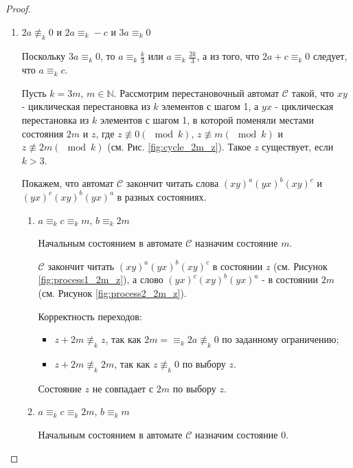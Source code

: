 \begin{proof}
\begin{enumerate}
			\item $2a \not \equiv_k 0$ и $2a \equiv_k -c$ и $3a \equiv_k 0$
			
			Поскольку $3a \equiv_k 0$, то $a \equiv_k \frac{k}{3}$ или $a \equiv_k \frac{2k}{3}$, а из того, что $2a+c \equiv_k 0$ следует, что $a \equiv_k c$.
			
			
			Пусть $k = 3m$, $m \in \mathbb{N}$.
			Рассмотрим перестановочный автомат $\mathscr{C}$ такой, что $xy$ - циклическая перестановка из $k$ элементов с шагом 1, а $yx$ - циклическая перестановка из $k$ элементов с шагом 1, в которой поменяли местами состояния $2m$ и $z$, где $z \not \equiv 0 (\mod k)$, $z \not \equiv m (\mod k)$ и $z \not \equiv 2m (\mod k)$ (см. Рис. \ref{fig:cycle_2m_z}). Такое $z$ существует, если $k > 3$.
			
			Покажем, что автомат $\mathscr{C}$ закончит читать слова $(xy)^a(yx)^b(xy)^c$ и $(yx)^c(xy)^b(yx)^a$ в разных состояниях.
			
			\begin{enumerate}
				\item $a \equiv_k c \equiv_k m$, $b \equiv_k 2m$
				
				Начальным состоянием в автомате $\mathscr{C}$ назначим состояние $m$.
				
				$\mathscr{C}$ закончит читать $(xy)^a(yx)^b(xy)^c$ в состоянии $z$ (см. Рисунок \ref{fig:process1_2m_z}), а слово $(yx)^c(xy)^b(yx)^a$ - в состоянии $2m$ (см. Рисунок \ref{fig:process2_2m_z}).
				
				Корректность переходов:
				\begin{itemize}
					\item $z + 2m \not \equiv_k z$, так как $2m = \equiv_k 2a \not \equiv_k 0$ по заданному ограничению;
					\item $z + 2m \not \equiv_k 2m$, так как $z \not \equiv_k 0$ по выбору $z$.
				\end{itemize}
				Состояние $z$ не совпадает с $2m$ по выбору $z$.
				
				\item $a \equiv_k c \equiv_k 2m$, $b \equiv_k m$
				
				Начальным состоянием в автомате $\mathscr{C}$ назначим состояние $0$.
				

\end{enumerate}
\end{enumerate}
\end{proof}
